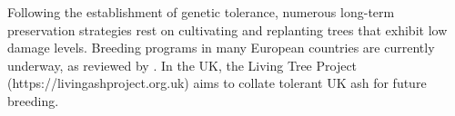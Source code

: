 Following the establishment of genetic tolerance, numerous long-term preservation strategies 
rest on cultivating and replanting trees that exhibit low damage levels. Breeding 
programs in many European countries are currently underway, as reviewed by \cite{https://doi.org/10.1002/ppp3.10060}.
In the UK, the Living Tree Project (https://livingashproject.org.uk) aims to collate tolerant UK ash for future breeding.


